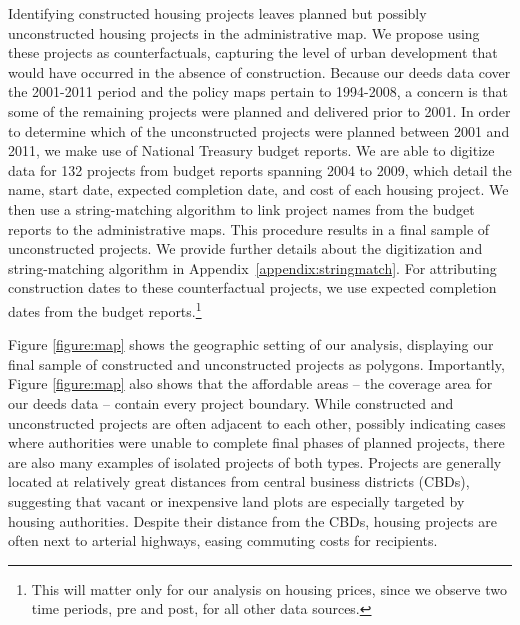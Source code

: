 \documentclass[12pt]{article}
\begin{document}
Identifying constructed housing projects leaves planned but possibly unconstructed housing projects in the administrative map.  We propose using these projects as counterfactuals, capturing the level of urban development that would have occurred in the absence of construction. Because our deeds data cover the 2001-2011 period and the policy maps pertain to 1994-2008, a concern is that some of the remaining projects were planned and delivered prior to 2001. In order to determine which of the unconstructed projects were planned between 2001 and 2011, we make use of National Treasury budget reports.  We are able to digitize data for 132 projects from budget reports spanning 2004 to 2009, which detail the name, start date, expected completion date, and cost of each housing project.  We then use a string-matching algorithm to link project names from the budget reports to the administrative maps. This procedure results in a final sample of unconstructed projects. We provide further details about the digitization and string-matching algorithm in Appendix~\ref{appendix:stringmatch}. For attributing construction dates to these counterfactual projects,  we use expected completion dates from the budget reports.\footnote{This will matter only for our analysis on housing prices, since we observe two time periods, pre and post, for all other data sources. }

Figure \ref{figure:map} shows the geographic setting of our analysis, displaying our final sample of constructed and unconstructed projects as polygons. Importantly, Figure \ref{figure:map} also shows that the affordable areas -- the coverage area for our deeds data -- contain every project boundary. While constructed and unconstructed projects are often adjacent to each other, possibly indicating cases where authorities were unable to complete final phases of planned projects, there are also many examples of isolated projects of both types.  Projects are generally located at relatively great distances from central business districts (CBDs), suggesting that vacant or inexpensive land plots are especially targeted by housing authorities.  Despite their distance from the CBDs, housing projects are often next to arterial highways, easing commuting costs for recipients.
\end{document}
